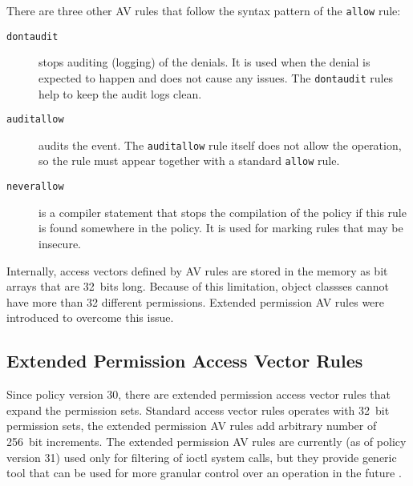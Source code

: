 There are three other AV rules that follow the syntax pattern of the
\texttt{allow} rule:
\begin{description}
    \item [\texttt{dontaudit}] stops auditing (logging) of the denials. It is
        used when the denial is expected to happen and does not cause any
        issues. The \texttt{dontaudit} rules help to keep the audit logs clean.
    \item [\texttt{auditallow}] audits the event. The \texttt{auditallow} rule
        itself does not allow the operation, so the rule must appear together
        with a standard \texttt{allow} rule.
    \item [\texttt{neverallow}] is a compiler statement that stops the
        compilation of the policy if this rule is found somewhere in the policy.
        It is used for marking rules that may be insecure.
\end{description}
Internally, access vectors defined by AV rules are stored in the memory as bit
arrays that are 32~bits long. Because of this limitation, object classses cannot
have more than 32 different permissions. Extended permission AV rules were
introduced to overcome this issue.

\subsection{Extended Permission Access Vector Rules}
\label{extavrules}

Since policy version 30, there are extended permission access vector rules that
expand the permission sets. Standard access vector rules operates with 32~bit
permission sets, the extended permission AV rules add arbitrary number of
256~bit increments. The extended permission AV rules are currently (as of policy
version 31) used only for filtering of ioctl system calls, but they provide
generic tool that can be used for more granular control over an operation in the
future \cite{selinuxmailxperms}.

